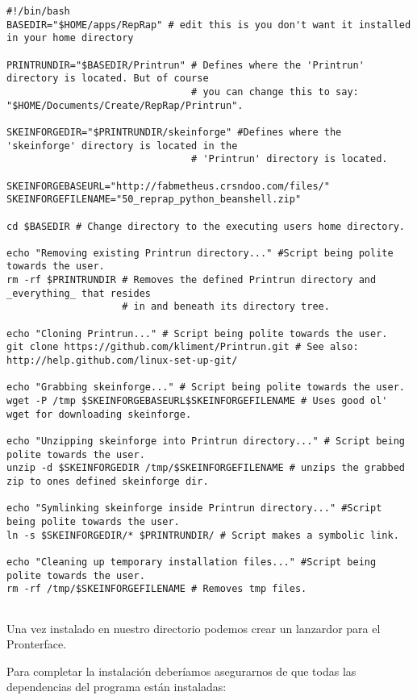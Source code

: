\begin{verbatim}
#!/bin/bash
BASEDIR="$HOME/apps/RepRap" # edit this is you don't want it installed in your home directory

PRINTRUNDIR="$BASEDIR/Printrun" # Defines where the 'Printrun' directory is located. But of course
                                # you can change this to say: "$HOME/Documents/Create/RepRap/Printrun".

SKEINFORGEDIR="$PRINTRUNDIR/skeinforge" #Defines where the 'skeinforge' directory is located in the
                                # 'Printrun' directory is located.

SKEINFORGEBASEURL="http://fabmetheus.crsndoo.com/files/"
SKEINFORGEFILENAME="50_reprap_python_beanshell.zip"

cd $BASEDIR # Change directory to the executing users home directory.

echo "Removing existing Printrun directory..." #Script being polite towards the user.
rm -rf $PRINTRUNDIR # Removes the defined Printrun directory and _everything_ that resides
                    # in and beneath its directory tree.

echo "Cloning Printrun..." # Script being polite towards the user.
git clone https://github.com/kliment/Printrun.git # See also: http://help.github.com/linux-set-up-git/

echo "Grabbing skeinforge..." # Script being polite towards the user.
wget -P /tmp $SKEINFORGEBASEURL$SKEINFORGEFILENAME # Uses good ol' wget for downloading skeinforge.

echo "Unzipping skeinforge into Printrun directory..." # Script being polite towards the user.
unzip -d $SKEINFORGEDIR /tmp/$SKEINFORGEFILENAME # unzips the grabbed zip to ones defined skeinforge dir.

echo "Symlinking skeinforge inside Printrun directory..." #Script being polite towards the user.
ln -s $SKEINFORGEDIR/* $PRINTRUNDIR/ # Script makes a symbolic link.

echo "Cleaning up temporary installation files..." #Script being polite towards the user.
rm -rf /tmp/$SKEINFORGEFILENAME # Removes tmp files.
      
\end{verbatim}

Una vez instalado en nuestro directorio podemos crear un lanzardor para
el Pronterface.

Para completar la instalación deberíamos asegurarnos de que todas las
dependencias del programa están instaladas:

